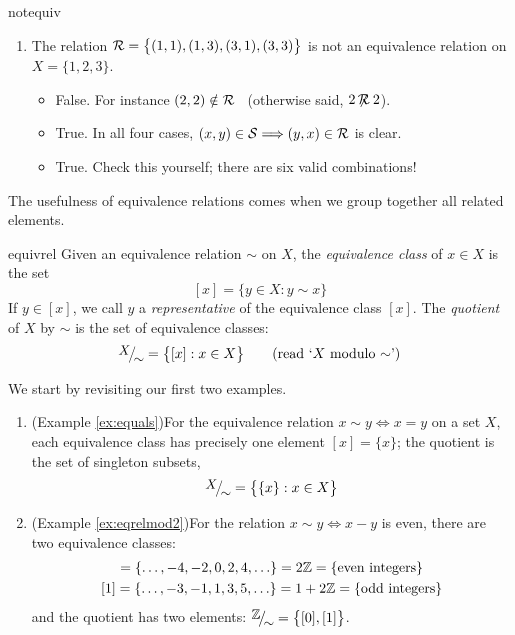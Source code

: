 \begin{examples}{}{notequiv}
\begin{enumerate}
		\item\label{ex:notequiv3} The relation $\mathcal{R}=\bigl\{(1,1),(1,3),(3,1),(3,3)\bigr\}$ is not an equivalence relation on $X=\{1,2,3\}$.
		\begin{itemize}
			\item[] False. For instance $(2,2)\notin\mathcal{R}$ \ (otherwise said, $2\mathbin{\not\!\!\mathcal{R}} 2$).
			\item[]\eqsymm True. In all four cases, $(x,y)\in\mathcal{S}\Longrightarrow (y,x)\in\mathcal{R}$ is clear.
			\item[]\eqtrans True. Check this yourself; there are six valid combinations!
		\end{itemize} 
	\end{enumerate}
\end{examples}


The usefulness of equivalence relations comes when we group together all related elements.

\begin{defn}{}{equivrel}
	Given an equivalence relation $\sim$ on $X$, the \emph{equivalence class} of $x\in X$ is the set
	\[
		[x]=\{y\in X:y\sim x\} \tag{$y\in [x]\Longleftrightarrow y\sim x$}
	\]
	If $y\in[x]$, we call $y$ a \emph{representative} of the equivalence class $[x]$. The \emph{quotient} of $X$ by $\sim$ is the set of equivalence classes:
	\[
		\quotient X\sim=\bigl\{[x]:x\in X\bigr\} \tag{read `$X$ modulo $\sim$'}
	\]
\end{defn}

\begin{examples}{}{}
	We start by revisiting our first two examples.
	\begin{enumerate}
	  \item (Example \ref{ex:equals})\lstsp For the equivalence relation $x\sim y\Longleftrightarrow x=y$ on a set $X$, each equivalence class has precisely one element $[x]=\{x\}$; the quotient is the set of singleton subsets,
	  \[
	  	\quotient X\sim=\bigl\{\{x\}:x\in X\bigr\}
	  \]
	  \item (Example \ref{ex:eqrelmod2})\lstsp For the relation $x\sim y\Longleftrightarrow x-y$ is even, there are two equivalence classes:
	  \begin{gather*}
	  	[0]=\{\ldots,-4,-2,0,2,4,\ldots\}
	  	=2\Z=\{\text{even integers}\}\\
	  	[1]=\{\ldots,-3,-1,1,3,5,\ldots\}
	  	=1+2\Z=\{\text{odd integers}\}
	  \end{gather*}
	  and the quotient has two elements: $\quotient{\Z}\sim=\bigl\{[0],[1]\bigr\}$.
	\end{enumerate}
\end{examples}

